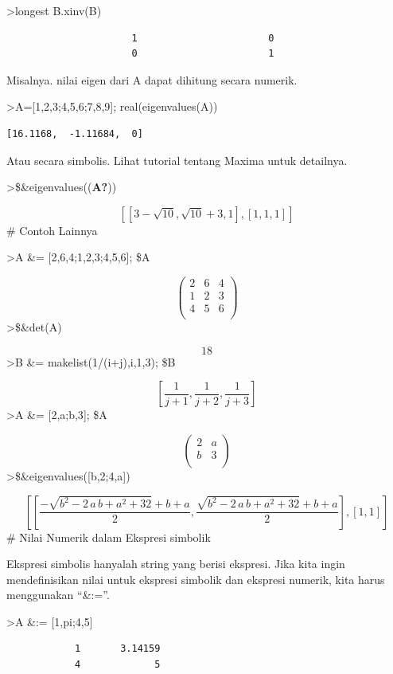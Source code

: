 \documentclass[
]{book}
\begin{document}
\textgreater longest B.xinv(B)

\begin{verbatim}
                      1                       0 
                      0                       1 
\end{verbatim}

Misalnya. nilai eigen dari A dapat dihitung secara numerik.

\textgreater A={[}1,2,3;4,5,6;7,8,9{]}; real(eigenvalues(A))

\begin{verbatim}
[16.1168,  -1.11684,  0]
\end{verbatim}

Atau secara simbolis. Lihat tutorial tentang Maxima untuk detailnya.

\textgreater\$\&eigenvalues((\textbf{A?}))

\[\left[ \left[ 3-\sqrt{10} , \sqrt{10}+3 , 1 \right]  , \left[ 1 , 1   , 1 \right]  \right] \]\# Contoh Lainnya

\textgreater A \&= {[}2,6,4;1,2,3;4,5,6{]}; \$A

\[\begin{pmatrix}2 & 6 & 4 \\ 1 & 2 & 3 \\ 4 & 5 & 6 \\ \end{pmatrix}\]\textgreater\$\&det(A)

\[18\]\textgreater B \&= makelist(1/(i+j),i,1,3); \$B

\[\left[ \frac{1}{j+1} , \frac{1}{j+2} , \frac{1}{j+3} \right] \]\textgreater A \&= {[}2,a;b,3{]}; \$A

\[\begin{pmatrix}2 & a \\ b & 3 \\ \end{pmatrix}\]\textgreater\$\&eigenvalues({[}b,2;4,a{]})

\[\left[ \left[ \frac{-\sqrt{b^2-2\,a\,b+a^2+32}+b+a}{2} , \frac{  \sqrt{b^2-2\,a\,b+a^2+32}+b+a}{2} \right]  , \left[ 1 , 1 \right]    \right] \]\# Nilai Numerik dalam Ekspresi simbolik

Ekspresi simbolis hanyalah string yang berisi ekspresi. Jika kita ingin mendefinisikan nilai untuk ekspresi simbolik dan ekspresi numerik, kita harus menggunakan ``\&:=''.

\textgreater A \&:= {[}1,pi;4,5{]}

\begin{verbatim}
            1       3.14159 
            4             5 
\end{verbatim}
\end{document}
